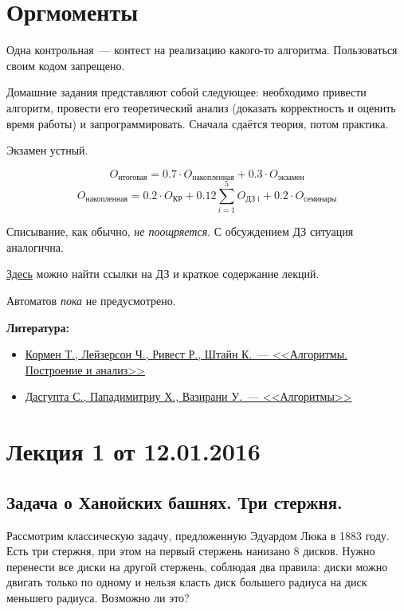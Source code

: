 



\section{Оргмоменты}
Одна контрольная~--- контест на реализацию какого-то алгоритма. Пользоваться своим кодом запрещено.

Домашние задания представляют собой следующее: необходимо привести алгоритм, провести его теоретический анализ (доказать корректность и оценить время работы) и запрограммировать. Сначала сдаётся теория, потом практика.

Экзамен устный.

\[O_{\text{итоговая}} = 0.7 \cdot O_{\text{накопленная}}+0.3 \cdot O_{\text{экзамен}}\]
\[O_{\text{накопленная}} = 0.2 \cdot O_{\text{КР}} + 0.12 \sum\limits_{i = 1}^{5} O_{\text{ДЗ i}} + 0.2 \cdot O_{\text{семинары}}\]

Списывание, как обычно, \emph{не поощряется}. С обсуждением ДЗ ситуация аналогична.

\href{http://wiki.cs.hse.ru/}{Здесь} можно найти ссылки на ДЗ и краткое содержание лекций.

Автоматов \emph{пока} не предусмотрено.

\textbf{Литература:}
\begin{itemize}
    \item \href{https://yadi.sk/i/1enAa7YHmruFw}{Кормен Т., Лейзерсон Ч., Ривест Р., Штайн К.~--- <<Алгоритмы. Построение и анализ>>}
    \item \href{https://yadi.sk/i/E_0-SVipmrvPz}{Дасгупта С., Пападимитриу Х., Вазирани У.~--- <<Алгоритмы>>}
\end{itemize}

\section{Лекция 1 от 12.01.2016}

\subsection{Задача о Ханойских башнях. Три стержня.}
Рассмотрим классическую задачу, предложенную Эдуардом Люка в 1883 году. Есть три стержня, при этом на первый стержень нанизано 8 дисков. Нужно перенести все диски на другой стержень, соблюдая два правила: диски можно двигать только по одному и нельзя класть
диск большего радиуса на диск меньшего радиуса. Возможно ли это?

